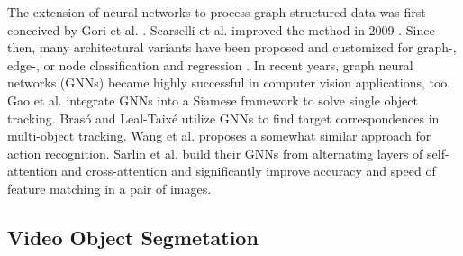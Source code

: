 \documentclass[conference]{IEEEtran}
\begin{document}
The extension of neural networks to process graph-structured data was first conceived by Gori et al. \cite{gnn_2005}. Scarselli et al. improved the method in 2009 \cite{gnn_2009}. Since then, many architectural variants have been proposed \cite{gnn_survey18, gnn_survey20} and customized for graph-, edge-, or node classification and regression \cite{gnn_graphsage, gnn_gat, gnn_gated_gcn}. In recent years, graph neural networks (GNNs) became highly successful in computer vision applications, too. Gao et al. \cite{gnn_gao_tracking19} integrate GNNs into a Siamese framework to solve single object tracking. Bras\'o and Leal-Taix\'e \cite{gnn_braso_tracking} utilize GNNs to find target correspondences in multi-object tracking. Wang et al. \cite{gnn_wang_actionrec18} proposes a somewhat similar approach for action recognition. Sarlin et al. \cite{gnn_sarlin_superglue} build their GNNs from alternating layers of self-attention and cross-attention and significantly improve accuracy and speed of feature matching in a pair of images.

\subsection{Video Object Segmetation}


\newcommand\figqualwidthratioM{0.19}
\newcommand\figqualgthspaceM{0.1}
\end{document}
